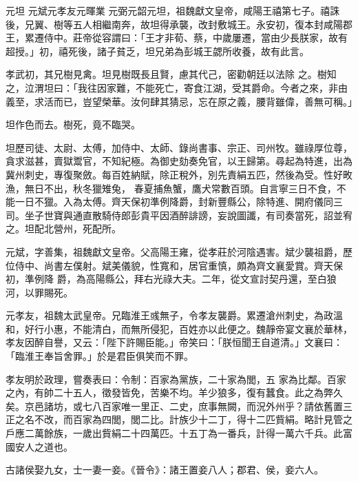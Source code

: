 
\begin{pinyinscope}

 元坦
 元斌元孝友元暉業
 元弼元韶元坦，祖魏獻文皇帝，咸陽王禧第七子。禧誅後，兄翼、樹等五人相繼南奔，故坦得承襲，改封敷城王。永安初，復本封咸陽郡王，累遷侍中。莊帝從容謂曰：「王才非荀、蔡，中歲屢遷，當由少長朕家，故有超授。」初，禧死後，諸子貧乏，坦兄弟為彭城王勰所收養，故有此言。



 孝武初，其兄樹見禽。坦見樹既長且賢，慮其代己，密勸朝廷以法除
 之。樹知之，泣渭坦曰：「我往因家難，不能死亡，寄食江湖，受其爵命。今者之來，非由義至，求活而已，豈望榮華。汝何肆其猜忌，忘在原之義，腰背雖偉，善無可稱。」



 坦作色而去。樹死，竟不臨哭。



 坦歷司徒、太尉、太傅，加侍中、太師、錄尚書事、宗正、司州牧。雖祿厚位尊，貪求滋甚，賣獄鬻官，不知紀極。為御史劾奏免官，以王歸第。尋起為特進，出為冀州刺史，專復聚斂。每百姓納賦，除正稅外，別先責絹五匹，然後為受。性好畋漁，無日不出，秋冬獵雉兔，
 春夏捕魚蟹，鷹犬常數百頭。自言寧三日不食，不能一日不獵。入為太傅。齊天保初準例降爵，封新豐縣公，除特進、開府儀同三司。坐子世寶與通直散騎侍郎彭貴平因酒醉誹謗，妄說圖讖，有司奏當死，詔並宥之。坦配北營州，死配所。



 元斌，字善集，祖魏獻文皇帝。父高陽王雍，從孝莊於河陰遇害。斌少襲祖爵，歷位侍中、尚書左僕射。斌美儀貌，性寬和，居官重慎，頗為齊文襄愛賞。齊天保初，準例降
 爵，為高陽縣公，拜右光祿大夫。二年，從文宣討契丹還，至白狼河，以罪賜死。



 元孝友，祖魏太武皇帝。兄臨淮王彧無子，令孝友襲爵。累遷滄州刺史，為政溫和，好行小惠，不能清白，而無所侵犯，百姓亦以此便之。魏靜帝宴文襄於華林，孝友因醉自譽，又云：「陛下許賜臣能。」帝笑曰：「朕恒聞王自道清。」文襄曰：「臨淮王奉旨舍罪。」於是君臣俱笑而不罪。



 孝友明於政理，嘗奏表曰：令制：百家為黨族，二十家為閭，五
 家為比鄰。百家之內，有帥二十五人，徵發皆免，苦樂不均。羊少狼多，復有蠶食。此之為弊久矣。京邑諸坊，或七八百家唯一里正、二史，庶事無闕，而況外州乎？請依舊置三正之名不改，而百家為四閭，閭二比。計族少十二丁，得十二匹貲絹。略計見管之戶應二萬餘族，一歲出貲絹二十四萬匹。十五丁為一番兵，計得一萬六千兵。此富國安人之道也。



 古諸侯娶九女，士一妻一妾。《晉令》：諸王置妾八人；郡君、侯，妾六人。




\end{pinyinscope}
